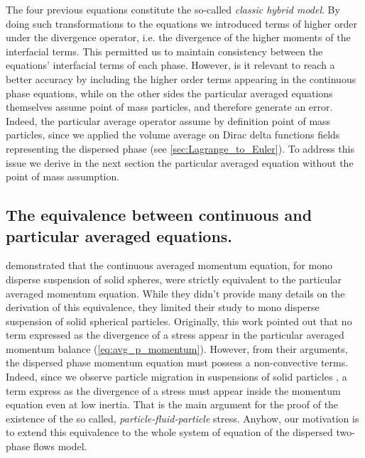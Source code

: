 The four previous equations constitute the so-called \textit{classic hybrid model}. 
By doing such transformations to the equations we introduced terms of higher order under the divergence operator, i.e. the divergence of the higher moments of the interfacial terms. 
This permitted us to maintain consistency between the equations' interfacial terms of each phase. 
However, is it relevant to reach a better accuracy by including the higher order terms appearing in the continuous phase equations, 
while on the other sides the particular averaged equations themselves assume point of mass particles, and therefore generate an error. 
Indeed, the particular average operator assume by definition point of mass particles, since we applied the volume average on Dirac delta functions fields representing the dispersed phase  (see \ref{sec:Lagrange_to_Euler}).  
To address this issue we derive in the next section the particular averaged equation without the point of mass assumption. 

\subsection{The equivalence between continuous and particular averaged equations.}

\citet{nott2011suspension} demonstrated that the continuous averaged momentum equation, for mono disperse suspension of solid spheres, were strictly equivalent to the particular averaged momentum equation.
While they didn't provide many details on the derivation of this equivalence, they limited their study to mono disperse suspension of solid spherical particles. 
Originally, this work pointed out that no term expressed as the divergence of a stress appear in the particular averaged momentum balance (\ref{eq:avg_p_momentum}).
However, from their arguments, the dispersed phase momentum equation must possess a non-convective terms.
Indeed, since we observe particle migration in suspensions of solid particles \citep{guazzelli2011}, a term express as the divergence of a stress must appear inside the momentum equation even at low inertia. 
That is the main argument for the proof of the existence of the so called, \textit{particle-fluid-particle} stress.
Anyhow, our motivation is to extend this equivalence to the whole system of equation of the dispersed two-phase flows model.  

